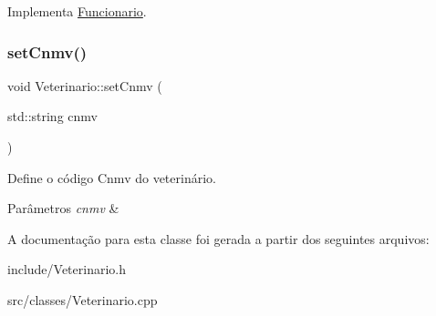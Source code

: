 Implementa \hyperlink{classFuncionario_a696332cf5ccde3a31f84e5af687e7ec2}{Funcionario}.

\mbox{\label{classVeterinario_a7c1e4210f1f1be4c2c45e0d16afb2e63}} 
\subsubsection{\texorpdfstring{set\+Cnmv()}{setCnmv()}}
{\footnotesize\ttfamily void Veterinario\+::set\+Cnmv (\begin{DoxyParamCaption}\item[{std\+::string}]{cnmv }\end{DoxyParamCaption})}



Define o código Cnmv do veterinário. 


\begin{DoxyParams}{Parâmetros}
{\em cnmv} & \\
\hline
\end{DoxyParams}


A documentação para esta classe foi gerada a partir dos seguintes arquivos\+:\begin{DoxyCompactItemize}
\item 
include/Veterinario.\+h\item 
src/classes/Veterinario.\+cpp\end{DoxyCompactItemize}
